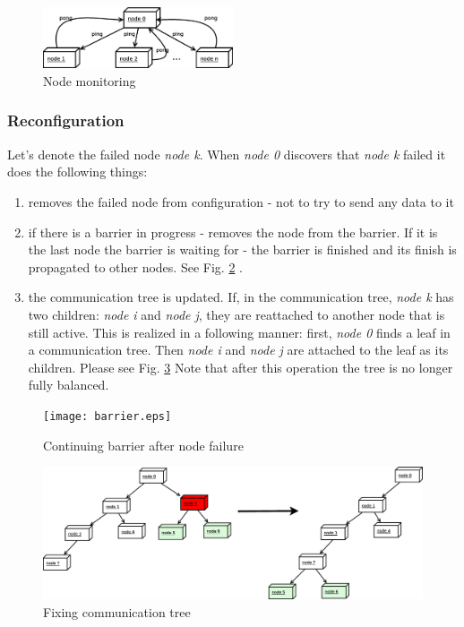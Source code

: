 \documentclass{llncs}
\begin{document}
\begin{figure}
  \centering
      \includegraphics[width=0.5\textwidth]{node-monitoring.eps}
  \caption{Node monitoring}
  \label{pinging}
\end{figure}

\subsubsection{Reconfiguration}
Let's denote the failed node \emph{node k}.
When \emph{node 0} discovers that \emph{node k} failed it does the following things:
\begin{enumerate}
\item removes the failed node from configuration - not to try to send any data to it
\item if there is a barrier in progress - removes the node from the barrier.
If it is the last node the barrier is waiting for - the barrier is finished and its finish is propagated to other nodes.
See Fig. \ref{barrier} .
\item the communication tree is updated. If, in the communication tree, \emph{node k} has two children: \emph{node i} and \emph{node j},
  they are reattached to another node that is still active. This is realized in a following manner: first, \emph{node 0} finds a leaf in a communication tree.
  Then \emph{node i} and \emph{node j} are attached to the leaf as its children. Please see Fig. \ref{communication-fix} 
  Note that after this operation the tree is no longer fully balanced.
\end{enumerate}



\begin{figure}
  \centering
      \texttt{[image: barrier.eps]}
  \caption{Continuing barrier after node failure}
  \label{barrier}
\end{figure}

\begin{figure}
  \centering
      \includegraphics[width=1\textwidth]{communicatio-tree-fix.eps}
  \caption{Fixing communication tree}
  \label{communication-fix}
\end{figure}
\end{document}
